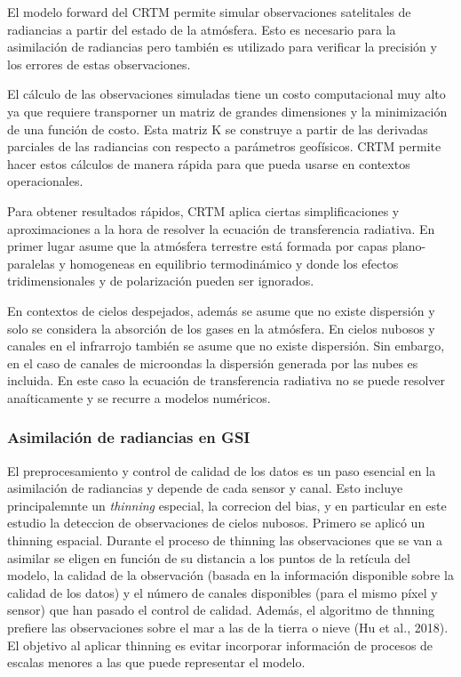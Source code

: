 \documentclass[12pt,oneside]{reedthesis}
\begin{document}
El modelo forward del CRTM permite simular observaciones satelitales de radiancias a partir del estado de la atmósfera. Esto es necesario para la asimilación de radiancias pero también es utilizado para verificar la precisión y los errores de estas observaciones.

El cálculo de las observaciones simuladas tiene un costo computacional muy alto ya que requiere transporner un matriz de grandes dimensiones y la minimización de una función de costo. Esta matriz K se construye a partir de las derivadas parciales de las radiancias con respecto a parámetros geofísicos. CRTM permite hacer estos cálculos de manera rápida para que pueda usarse en contextos operacionales.

Para obtener resultados rápidos, CRTM aplica ciertas simplificaciones y aproximaciones a la hora de resolver la ecuación de transferencia radiativa. En primer lugar asume que la atmósfera terrestre está formada por capas plano-paralelas y homogeneas en equilibrio termodinámico y donde los efectos tridimensionales y de polarización pueden ser ignorados.

En contextos de cielos despejados, además se asume que no existe dispersión y solo se considera la absorción de los gases en la atmósfera. En cielos nubosos y canales en el infrarrojo también se asume que no existe dispersión. Sin embargo, en el caso de canales de microondas la dispersión generada por las nubes es incluida. En este caso la ecuación de transferencia radiativa no se puede resolver anaíticamente y se recurre a modelos numéricos.

\hypertarget{sat}{%
\subsubsection{Asimilación de radiancias en GSI}\label{sat}}

El preprocesamiento y control de calidad de los datos es un paso esencial en la asimilación de radiancias y depende de cada sensor y canal. Esto incluye principalemnte un \emph{thinning} especial, la correcion del bias, y en particular en este estudio la deteccion de observaciones de cielos nubosos. Primero se aplicó un thinning espacial. Durante el proceso de thinning las observaciones que se van a asimilar se eligen en función de su distancia a los puntos de la retícula del modelo, la calidad de la observación (basada en la información disponible sobre la calidad de los datos) y el número de canales disponibles (para el mismo píxel y sensor) que han pasado el control de calidad. Además, el algoritmo de thnning prefiere las observaciones sobre el mar a las de la tierra o nieve (Hu et al., 2018). El objetivo al aplicar thinning es evitar incorporar información de procesos de escalas menores a las que puede representar el modelo.
\end{document}

